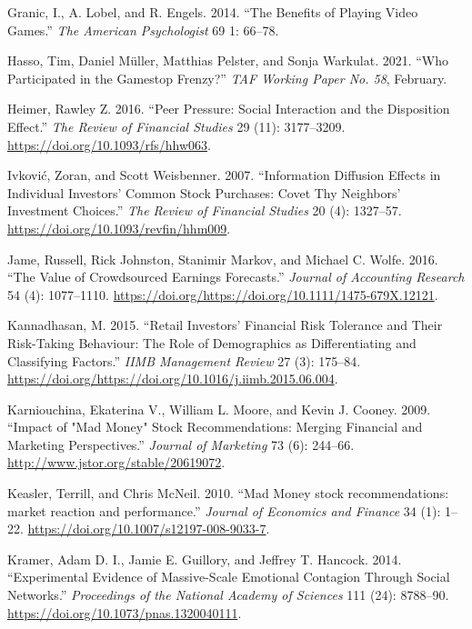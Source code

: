 \documentclass[12pt,]{article}
\begin{document}
\leavevmode\hypertarget{ref-granic2014}{}%
Granic, I., A. Lobel, and R. Engels. 2014. ``The Benefits of Playing
Video Games.'' \emph{The American Psychologist} 69 1: 66--78.

\leavevmode\hypertarget{ref-hasso2021}{}%
Hasso, Tim, Daniel Müller, Matthias Pelster, and Sonja Warkulat. 2021.
``Who Participated in the Gamestop Frenzy?'' \emph{TAF Working Paper No.
58}, February.

\leavevmode\hypertarget{ref-heimer2016}{}%
Heimer, Rawley Z. 2016. ``Peer Pressure: Social Interaction and the
Disposition Effect.'' \emph{The Review of Financial Studies} 29 (11):
3177--3209. \url{https://doi.org/10.1093/rfs/hhw063}.

\leavevmode\hypertarget{ref-ivkovic2007}{}%
Ivković, Zoran, and Scott Weisbenner. 2007. ``Information Diffusion
Effects in Individual Investors' Common Stock Purchases: Covet Thy
Neighbors' Investment Choices.'' \emph{The Review of Financial Studies}
20 (4): 1327--57. \url{https://doi.org/10.1093/revfin/hhm009}.

\leavevmode\hypertarget{ref-jame2016}{}%
Jame, Russell, Rick Johnston, Stanimir Markov, and Michael C. Wolfe.
2016. ``The Value of Crowdsourced Earnings Forecasts.'' \emph{Journal of
Accounting Research} 54 (4): 1077--1110.
\url{https://doi.org/https://doi.org/10.1111/1475-679X.12121}.

\leavevmode\hypertarget{ref-kannadhasan2015}{}%
Kannadhasan, M. 2015. ``Retail Investors' Financial Risk Tolerance and
Their Risk-Taking Behaviour: The Role of Demographics as Differentiating
and Classifying Factors.'' \emph{IIMB Management Review} 27 (3):
175--84.
\url{https://doi.org/https://doi.org/10.1016/j.iimb.2015.06.004}.

\leavevmode\hypertarget{ref-karniouchina2009}{}%
Karniouchina, Ekaterina V., William L. Moore, and Kevin J. Cooney. 2009.
``Impact of "Mad Money" Stock Recommendations: Merging Financial and
Marketing Perspectives.'' \emph{Journal of Marketing} 73 (6): 244--66.
\url{http://www.jstor.org/stable/20619072}.

\leavevmode\hypertarget{ref-keasler2010}{}%
Keasler, Terrill, and Chris McNeil. 2010. ``Mad Money stock
recommendations: market reaction and performance.'' \emph{Journal of
Economics and Finance} 34 (1): 1--22.
\url{https://doi.org/10.1007/s12197-008-9033-7}.

\leavevmode\hypertarget{ref-kramer2014}{}%
Kramer, Adam D. I., Jamie E. Guillory, and Jeffrey T. Hancock. 2014.
``Experimental Evidence of Massive-Scale Emotional Contagion Through
Social Networks.'' \emph{Proceedings of the National Academy of
Sciences} 111 (24): 8788--90.
\url{https://doi.org/10.1073/pnas.1320040111}.
\end{document}
